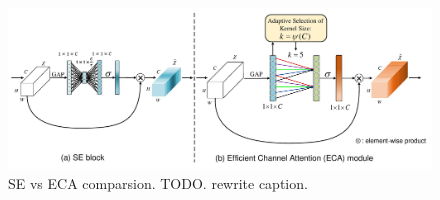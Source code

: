 \begin{figure}[h!]
  \caption{SE vs ECA comparsion. TODO. rewrite caption.}
  \label{fig: se-eca}
  \includegraphics[width=1\textwidth]{images/eca_module.jpg}
\end{figure}











